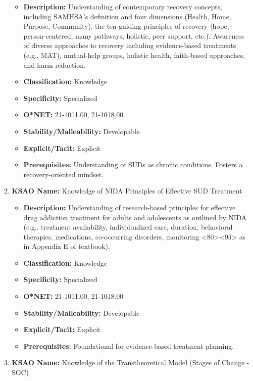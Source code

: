 \documentclass[
  letterpaper,
  DIV=11,
  numbers=noendperiod]{scrartcl}
\providecommand{\tightlist}{%
  \setlength{\itemsep}{0pt}\setlength{\parskip}{0pt}}
\begin{document}
\begin{enumerate}
  \begin{itemize}
  \tightlist
  \item
    \textbf{Description:} Understanding of contemporary recovery
    concepts, including SAMHSA's definition and four dimensions (Health,
    Home, Purpose, Community), the ten guiding principles of recovery
    (hope, person-centered, many pathways, holistic, peer support,
    etc.). Awareness of diverse approaches to recovery including
    evidence-based treatments (e.g., MAT), mutual-help groups, holistic
    health, faith-based approaches, and harm reduction.
  \item
    \textbf{Classification:} Knowledge
  \item
    \textbf{Specificity:} Specialized
  \item
    \textbf{O*NET:} 21-1011.00, 21-1018.00
  \item
    \textbf{Stability/Malleability:} Developable
  \item
    \textbf{Explicit/Tacit:} Explicit
  \item
    \textbf{Prerequisites:} Understanding of SUDs as chronic conditions.
    Fosters a recovery-oriented mindset.
  \end{itemize}
\item
  \textbf{KSAO Name:} Knowledge of NIDA Principles of Effective SUD
  Treatment

  \begin{itemize}
  \tightlist
  \item
    \textbf{Description:} Understanding of research-based principles for
    effective drug addiction treatment for adults and adolescents as
    outlined by NIDA (e.g., treatment availability, individualized care,
    duration, behavioral therapies, medications, co-occurring disorders,
    monitoring \textless80\textgreater\textless93\textgreater{} as in
    Appendix E of textbook).
  \item
    \textbf{Classification:} Knowledge
  \item
    \textbf{Specificity:} Specialized
  \item
    \textbf{O*NET:} 21-1011.00, 21-1018.00
  \item
    \textbf{Stability/Malleability:} Developable
  \item
    \textbf{Explicit/Tacit:} Explicit
  \item
    \textbf{Prerequisites:} Foundational for evidence-based treatment
    planning.
  \end{itemize}
\item
  \textbf{KSAO Name:} Knowledge of the Transtheoretical Model (Stages of
  Change - SOC)


\end{enumerate}
\end{document}

